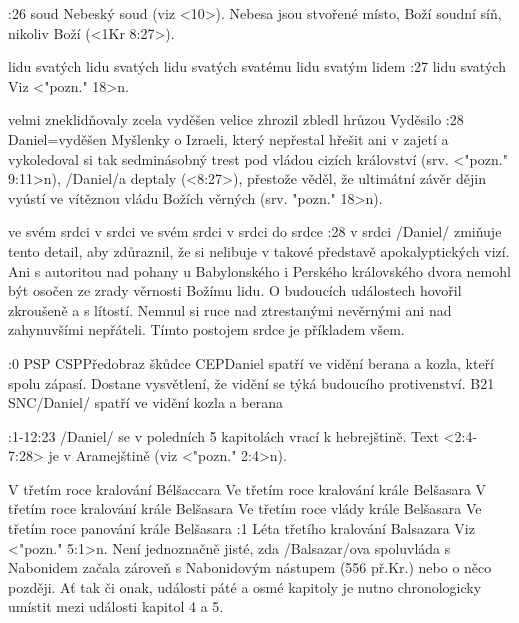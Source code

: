 :26 {soud} Nebeský soud (viz <10>). Nebesa jsou stvořené místo, Boží soudní síň, nikoliv Boží  (<1Kr 8:27>). 

    {lidu svatých} %
    {lidu svatých}  %
    {lidu svatých} %
    {svatému lidu}  %
    {svatým lidem}  %
:27 {lidu svatých} Viz  <"pozn." 18>n.

    {velmi zneklidňovaly} %
    {zcela vyděšen}  %
    {velice zhrozil} %
    {zbledl hrůzou}  %
    {Vyděsilo}  %
:28 {Daniel}={vyděšen} Myšlenky o Izraeli, který nepřestal hřešit ani v zajetí a vykoledoval si tak sedminásobný trest pod vládou cizích království   (srv. <"pozn." 9:11>n), \x/Daniel/a deptaly (<8:27>), přestože věděl, že ultimátní závěr dějin vyústí ve vítěznou vládu Božích věrných  (srv. \<"pozn." 18>n).

   {ve svém srdci}   %
   {v srdci}   %
   {ve svém srdci}   %
   {v srdci}   %
   {do srdce}   %
:28 {v srdci} \x/Daniel/ zmiňuje tento detail, aby zdůraznil, že si nelibuje v takové představě apokalyptických vizí.  Ani s autoritou nad pohany u Babylonského i Perského královského dvora nemohl být osočen ze zrady věrnosti Božímu lidu. O budoucích událostech hovořil zkroušeně a s lítostí. Nemnul si ruce nad ztrestanými nevěrnými ani nad zahynuvšími nepřáteli. Tímto postojem srdce je příkladem všem.

:0 {}
% 
        {PSP}{}%
        {CSP}{Předobraz škůdce}%
        {CEP}{Daniel spatří ve vidění berana a kozla, kteří spolu zápasí.
          Dostane vysvětlení, že vidění se týká budoucího protivenství.}%
        {B21}{}%
        {SNC}{\x/Daniel/ spatří ve vidění kozla a berana}%

          

:1-12:23 {} \x/Daniel/ se v poledních 5 kapitolách vrací k hebrejštině. Text <2:4-7:28>
je v Aramejštině (viz <"pozn." 2:4>n).
   
   {V třetím roce kralování Bélšaccara}   %
   {Ve třetím roce kralování krále Belšasara}   %
   {V třetím roce kralování krále Belšasara}   %
   {Ve třetím roce vlády krále Belšasara}   %
   {Ve třetím roce panování krále Belšasara}   %
:1 {Léta třetího kralování Balsazara}
     Viz <"pozn." 5:1>n. Není jednoznačně jisté, zda \x/Balsazar/ova
     spoluvláda s Nabonidem začala zároveň s Nabonidovým nástupem (556 př.Kr.) nebo o něco
     později. Ať tak či onak, události páté a osmé kapitoly je nutno chronologicky umístit
     mezi události kapitol 4 a 5. 

